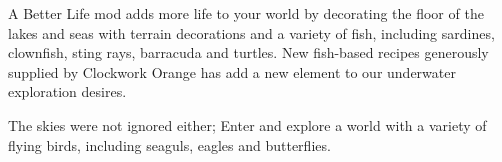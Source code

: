 A Better Life mod adds more life to your world by decorating the floor of the lakes and seas with terrain decorations and a variety of fish, including sardines, clownfish, sting rays, barracuda and turtles. New fish-\/based recipes generously supplied by Clockwork Orange has add a new element to our underwater exploration desires.

The skies were not ignored either; Enter and explore a world with a variety of flying birds, including seaguls, eagles and butterflies. 
